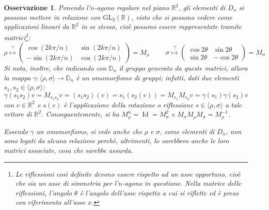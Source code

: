 \documentclass[11pt]{scrartcl}
\theoremstyle{style1}
\newtheorem{osservazione}{Osservazione}[section]
\numberwithin{equation}{subsection}
\begin{document}
\begin{osservazione}
	Ponendo l'$n$-agono regolare nel piano $\mathbb{R}^2$, gli elementi di $D_n$ si possono mettere in relazione con $\mathrm{GL} _2(\mathbb{R})$, visto che si possono vedere come applicazioni lineari da $\mathbb{R}^2$ in se stesso, cio\`e possono essere rappresentate tramite matrici\footnote{Le riflessioni cos\`i definite devono essere rispetto ad un asse opportuno, cio\`e che sia un asse di simmetria per l'$n$-agono in questione. Nella matrice delle riflessioni, l'angolo $\theta $ \`e l'angolo dell'asse rispetto a cui si riflette ed \`e preso con riferimento all'asse $x$.}:
\begin{equation*}
	\rho  \stackrel{\gamma}{\longmapsto} \begin{pmatrix} \displaystyle \cos \left(2k\pi / n\right) & \sin \left(2k\pi / n\right) \\ - \sin \left( 2k\pi / n\right) & \cos (2k\pi / n) \end{pmatrix}=M_\rho  \hspace{1cm}\sigma \stackrel{\gamma}{\longmapsto} \begin{pmatrix} \cos 2 \theta  & \sin 2\theta  \\ \sin 2\theta  & - \cos 2\theta  \end{pmatrix} = M_\sigma 
\end{equation*}
Si nota, inoltre, che indicando con $\mathbb{D}_n$ il gruppo generato da queste matrici, allora la mappa $\gamma : \langle \rho ,\sigma  \rangle\to \mathbb{D}_n$ \`e un omomorfismo di gruppi; infatti, dati due elementi $s_1,s_2 \in \langle \rho ,\sigma  \rangle$:
\[
\gamma(s_1s_2)v= M_{s_1s_2} v = (s_1s_2) (v) = s_1 (s_2 (v)) =M_{s_1} M_{s_2} v = \gamma(s_1)\gamma(s_2)v
\] 
con $v \in \mathbb{R}^2$ e $s(v)$ \`e l'applicazione della rotazione o riflessione $s \in \langle \rho ,\sigma  \rangle$ a tale vettore di $\mathbb{R}^2$.
Conseguentemente, si ha $M_\rho ^n = \operatorname{Id}=M_\sigma ^2 $ e $M_\sigma M_\rho M_\sigma = M_\rho ^{-1}$.

Essendo $\gamma$ un omomorfismo, si vede anche che $\rho $ e $\sigma $, come elementi di $D_n$, non sono legati da alcuna relazione perch\'e, altrimenti, lo sarebbero anche le loro matrici associate, cosa che sarebbe assurda. 
\end{osservazione}
\end{document}
